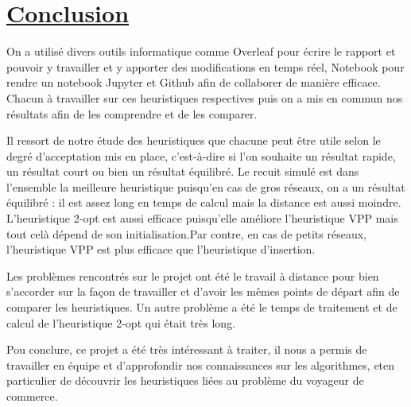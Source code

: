 \documentclass[a4paper,11pt,fleqn]{article}
\begin{document}
\newpage

\section*{\underline{Conclusion}}
On a utilisé divers outils informatique comme Overleaf pour écrire le rapport et pouvoir y travailler et y apporter des modifications en temps réel, Notebook pour rendre un notebook Jupyter et Github afin de collaborer de manière efficace.
Chacun à travailler sur ces heuristiques respectives puis on a mis en commun nos résultats afin de les comprendre et de les comparer.
\newline

Il ressort de notre étude des heuristiques que chacune peut être utile selon le degré d'acceptation mis en place, c'est-à-dire si l'on souhaite un résultat rapide, un résultat court ou bien un résultat équilibré. Le recuit simulé est  dans l'ensemble la meilleure heuristique puisqu'en cas de gros réseaux, on a un résultat équilibré : il est assez long en temps de calcul mais la distance est aussi moindre. L'heuristique 2-opt est aussi efficace puisqu'elle améliore l'heuristique VPP mais tout celà dépend de son initialisation.Par contre, en cas de petits réseaux, l'heuristique VPP est plus efficace que l'heuristique d'insertion.
\newline

Les problèmes rencontrés sur le projet ont été le travail à distance pour bien s'accorder sur la façon de travailler et d'avoir les mêmes points de départ afin de comparer les heuristiques.
Un autre problème a été le temps de traitement et de calcul de l'heuristique 2-opt qui était très long.
\newline

Pou conclure, ce projet a été très intéressant à traiter, il nous a permis de travailler en équipe et d'approfondir nos connaissances sur les algorithmes, eten particulier de découvrir les heuristiques liées au problème du voyageur de commerce.


\newpage


\end{document}
